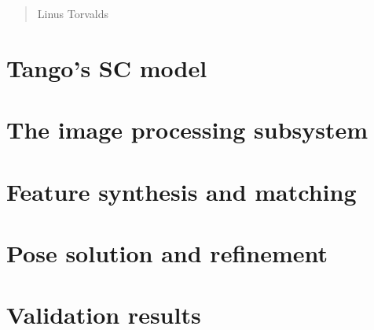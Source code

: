 \begin{quotation}
{\footnotesize
{}
\begin{flushright}
Linus Torvalds
\end{flushright}
}
\end{quotation}
\vspace{0.5cm}

\section{Tango's SC model}

\section{The image processing subsystem}

\section{Feature synthesis and matching}

\section{Pose solution and refinement}

\section{Validation results}
